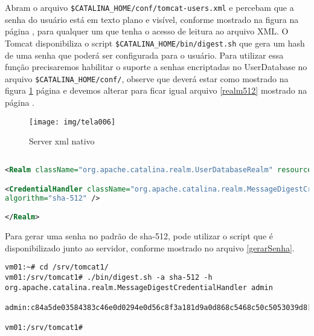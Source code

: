 


Abram o arquivo \texttt{\$CATALINA\_HOME/conf/tomcat-users.xml} e percebam que a senha do usuário está em texto plano e visível, conforme mostrado na figura  na página \pageref{fig:tomcat-users-texto-plano}, para qualquer um que tenha o acesso de leitura ao arquivo XML. O Tomcat disponibiliza o script \texttt{\$CATALINA\_HOME/bin/digest.sh} que gera um hash de uma senha que poderá ser configurada para o usuário. Para utilizar essa função precisaremos habilitar o suporte a senhas encriptadas no UserDatabase no arquivo \texttt{\$CATALINA\_HOME/conf/}, observe que deverá estar como mostrado na figura \ref{fig:tomcat-realm-nativo} página \pageref{fig:tomcat-realm-nativo} e devemos alterar para ficar igual arquivo \ref{realm512} mostrado na página \pageref{realm512}.

\begin{figure}[H]
	\centering
	\caption[server.xml]{Server xml nativo}
	\texttt{[image: img/tela006]}
	\label{fig:tomcat-realm-nativo}
\end{figure}


\begin{lstlisting}[language=xml, caption=\firacoderetina{server.xml}, basicstyle=\scriptsize\firacoderetina, 
label=realm512, showspaces=false, showtabs=false, showstringspaces='', firstnumber=139]	

<Realm className="org.apache.catalina.realm.UserDatabaseRealm" resourceName="UserDatabase">

<CredentialHandler className="org.apache.catalina.realm.MessageDigestCredentialHandler"
algorithm="sha-512" />

</Realm>

\end{lstlisting}

Para gerar uma senha no padrão de sha-512, pode utilizar o script que é disponibilizado junto ao servidor, conforme mostrado no arquivo \ref{gerarSenha}.	

\begin{lstlisting}[breaklines=true,basicstyle=\ttfamily, 
label=gerarSenha ,
breaklines=true,caption=\firacoderetina gerando senha,
postbreak=\mbox{\textcolor{red}{$\hookrightarrow$}\space},
showstringspaces=false]
vm01:~# cd /srv/tomcat1/
vm01:/srv/tomcat1# ./bin/digest.sh -a sha-512 -h org.apache.catalina.realm.MessageDigestCredentialHandler admin

admin:c84a5de03584383c46e0d0294e0d56c8f3a181d9a0d868c5468c50c5053039d8[...] 

vm01:/srv/tomcat1#

\end{lstlisting}

